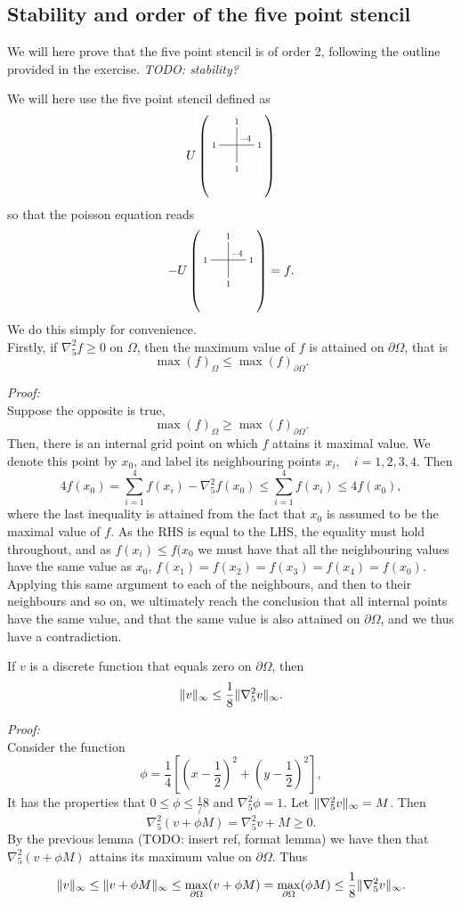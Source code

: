 \subsection{Stability and order of the five point stencil}
We will here prove that the five point stencil is of order 2, following the outline provided in the exercise.
\emph{TODO: stability?}

We will here use the five point stencil defined as
$$
U \left(\crossStencil{1}{1}{1}{1}{-4}\right)
$$
so that the poisson equation reads
$$
- U \left(\crossStencil{1}{1}{1}{1}{-4}\right) = f.
$$
We do this simply for convenience.\\

Firstly, if $\nabla_5^2 f \geq 0$ on $\Omega$, then the maximum value of $f$ is attained on $\partial \Omega$, that is
$$
\max(f)_\Omega \leq \max(f)_{\partial \Omega}.
$$

\emph{Proof:}\\
Suppose the opposite is true,
$$
\max(f)_\Omega \geq \max(f)_{\partial \Omega}.
$$
Then, there is an internal grid point on which $f$ attains it maximal value.
We denote this point by $x_0$, and label its neighbouring points $x_i,\quad i = 1,2,3,4$.
Then
$$
4f(x_0) = \sum_{i=1}^4 f(x_i) - \nabla_5^2 f(x_0) \leq \sum_{i=1}^4 f(x_i) \leq 4 f(x_0),
$$
where the last inequality is attained from the fact that $x_0$ is assumed to be the maximal value of $f$.
As the RHS is equal to the LHS, the equality must hold throughout, and as $f(x_i) \leq f(x_0$ we must have that all the neighbouring values have the same value as $x_0$, $f(x_1) = f(x_2) = f(x_3) = f(x_4) = f(x_0)$.
Applying this same argument to each of the neighbours, and then to their neighbours and so on, we ultimately reach the conclusion that all internal points have the same value, and that the same value is also attained on $\partial \Omega$, and we thus have a contradiction.

If $v$ is a discrete function that equals zero on $\partial \Omega$, then
$$
\lVert v \rVert_\infty \leq \frac18 \lVert \nabla_5^2 v \rVert_\infty.
$$

\emph{Proof:}\\
Consider the function
$$
\phi = \frac14 [ (x-\frac12)^2 + (y-\frac12)^2 ],
$$
It has the properties that $0 \leq \phi \leq \frac1/8$ and $\nabla_5^2 \phi = 1$.
Let $\lVert \nabla_5^2 v \rVert_\infty = M$.
Then
$$
\nabla_5^2 (v + \phi M) = \nabla_5^2 v +  M \geq 0.
$$
By the previous lemma (TODO: insert ref, format lemma) we have then that $\nabla_5^2 (v + \phi M)$ attains its maximum value on $\partial \Omega$.
Thus
$$
\lVert v \rVert_\infty
\leq \lVert v + \phi M \rVert_\infty
\leq \max_{\partial \Omega}(v + \phi M)
= \max_{\partial\Omega} (\phi M)
\leq \frac18 \lVert \nabla_5^2 v \rVert_\infty.
$$

